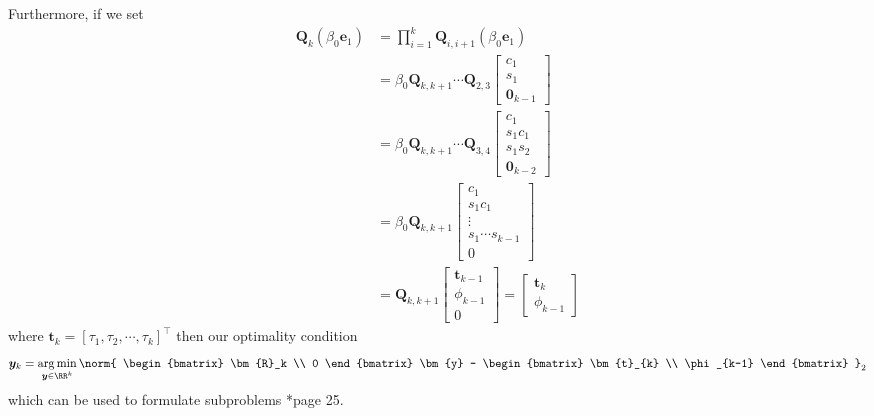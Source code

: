 Furthermore, if we set
\begin{align*}
    \bm{Q}_k \left( \beta_0 \bm{e}_1 \right) & = \prod_{i=1}^{k} \bm{Q}_{i,i+1} \left( \beta_0 \bm{e}_1 \right) \\
                                             & =
    \beta_0 \bm{Q}_{k,k+1} \cdots \bm{Q}_{2,3}
    \begin{bmatrix}
        c_1 \\ s_1 \\ \bm{0}_{k-1}
    \end{bmatrix}                                                                                  \\
                                             & =
    \beta_0 \bm{Q}_{k,k+1} \cdots \bm{Q}_{3,4}
    \begin{bmatrix}
        c_1 \\ s_1 c_1 \\ s_1 s_2 \\ \bm{0}_{k-2}
    \end{bmatrix}                                                                                  \\
                                             & =
    \beta_0 \bm{Q}_{k,k+1}
    \begin{bmatrix}
        c_1 \\ s_1 c_1 \\ \vdots \\ s_1 \cdots s_{k-1} \\ 0
    \end{bmatrix}                                                                                  \\
                                             & =
    \bm{Q}_{k,k+1}
    \begin{bmatrix}
        \bm{t}_{k-1} \\ \phi_{k-1} \\ 0
    \end{bmatrix}
    =
    \begin{bmatrix}
        \bm{t}_{k} \\ \phi_{k-1}
    \end{bmatrix}
\end{align*}
where $\bm{t}_k = \left[ \tau_1 , \tau_2 , \cdots , \tau_k \right]^{\intercal}$ then our optimality condition
\begin{equation*}
    \bm{y}_k = \argmin_{\bm{y} \in \RR^k} \norm{
        \begin{bmatrix}
            \bm{R}_k \\ 0
        \end{bmatrix} \bm{y} -
        \begin{bmatrix}
            \bm{t}_{k} \\ \phi_{k-1}
        \end{bmatrix}
    }_2
\end{equation*}
which can be used to formulate subproblems \cite{ChoiSou-ChengTerrya2007Imfs}*{page 25}.